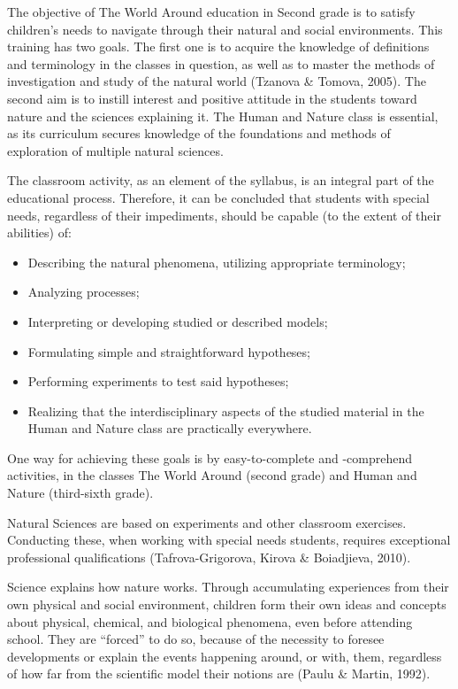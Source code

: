 \documentclass[11.5pt]{sig-alternate} %
\begin{document}
\begin{large}
The objective of The World Around education in Second grade is to satisfy children’s needs to navigate through their natural and social environments. This training has two goals. The first one is to acquire the knowledge of definitions and terminology in the classes in question, as well as to master the methods of investigation and study of the natural world (Tzanova \& Tomova, 2005). The second aim is to instill interest and positive attitude in the students toward nature and the sciences explaining it. The Human and Nature class is essential, as its curriculum secures knowledge of the foundations and methods of exploration of multiple natural sciences.

The classroom activity, as an element of the syllabus, is an integral part of the educational process. Therefore, it can be concluded that students with special needs, regardless of their impediments, should be capable (to the extent of their abilities) of:

\begin{itemize}
    \item Describing the natural phenomena, utilizing appropriate terminology;
    \item Analyzing processes;
    \item 	Interpreting or developing studied or described models;
    \item Formulating simple and straightforward hypotheses;
    \item 	Performing experiments to test said hypotheses;
    \item Realizing that the interdisciplinary aspects of the studied material in the Human and Nature class are practically everywhere.
\end{itemize}

One way for achieving these goals is by easy-to-complete and -comprehend activities, in the classes The World Around (second grade) and Human and Nature (third-sixth grade).

Natural Sciences are based on experiments and other classroom exercises. Conducting these, when working with special needs students, requires exceptional professional qualifications (Taf\-rova-Grigorova, Kirova \& Boiadjieva, 2010).

Science explains how nature works. Through accumulating experiences from their own physical and social environment, children form their own ideas and concepts about physical, chemical, and biological phenomena, even before attending school. They are “forced” to do so, because of the necessity to foresee developments or explain the events happening around, or with, them, regardless of how far from the scientific model their notions are (Paulu \& Martin, 1992).


\end{large}
\end{document}

